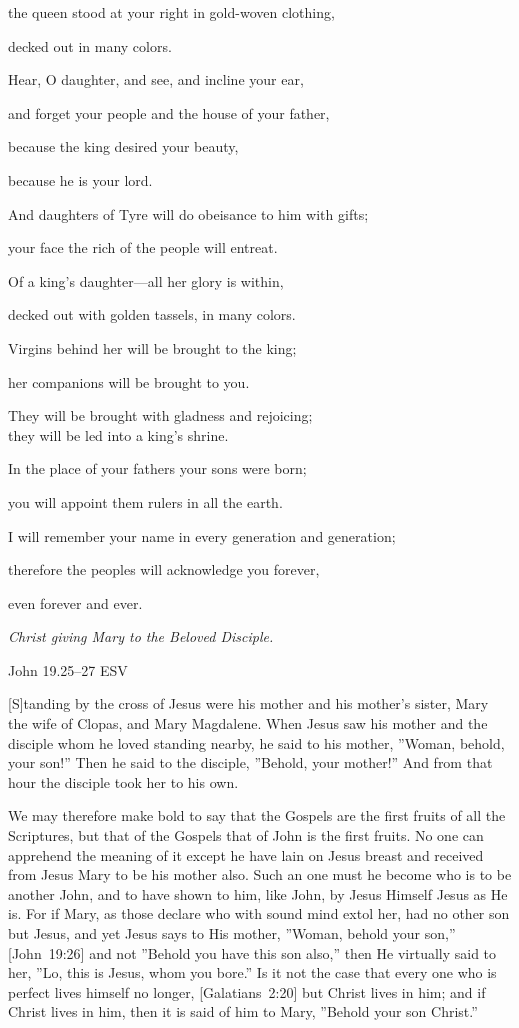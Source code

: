 \documentclass[
]{article}
\newcommand{\RL}[1]{\beginR #1\endR}
\begin{document}
the queen stood at your right in gold-woven clothing,

decked out in many colors.

Hear, O daughter, and see, and incline your ear,

and forget your people and the house of your father,

because the king desired your beauty,

because he is your lord.

And daughters of Tyre will do obeisance to him with gifts;

your face the rich of the people will entreat.

Of a king\RL{'}s daughter---all her glory is within,

decked out with golden tassels, in many colors.

Virgins behind her will be brought to the king;

her companions will be brought to you.

They will be brought with gladness and rejoicing;\\
they will be led into a king\RL{'}s shrine.

In the place of your fathers your sons were born;

you will appoint them rulers in all the earth.

I will remember your name in every generation and generation;

therefore the peoples will acknowledge you forever,

even forever and ever.

\emph{Christ giving Mary to the Beloved Disciple.}

John 19.25--27 ESV

{[}S{]}tanding by the cross of Jesus were his mother and his
mother\RL{'}s sister, Mary the wife of Clopas, and Mary Magdalene. When
Jesus saw his mother and the disciple whom he loved standing nearby, he
said to his mother, \RL{''}Woman, behold, your son!'' Then he said to
the disciple, \RL{''}Behold, your mother!'' And from that hour the
disciple took her to his own.

We may therefore make bold to say that the Gospels are the first fruits
of all the Scriptures, but that of the Gospels that of John is the first
fruits. No one can apprehend the meaning of it except he have lain on
Jesus\textquotesingle{} breast and received from Jesus Mary to be his
mother also. Such an one must he become who is to be another John, and
to have shown to him, like John, by Jesus Himself Jesus as He is. For if
Mary, as those declare who with sound mind extol her, had no other son
but Jesus, and yet Jesus says to His mother, \RL{''}Woman, behold your
son,'' {[}John~19:26{]} and not \RL{''}Behold you have this son also,''
then He virtually said to her, \RL{''}Lo, this is Jesus, whom you
bore.'' Is it not the case that every one who is perfect lives himself
no longer, {[}Galatians~2:20{]} but Christ lives in him; and if Christ
lives in him, then it is said of him to Mary, \RL{''}Behold your son
Christ.''
\end{document}
